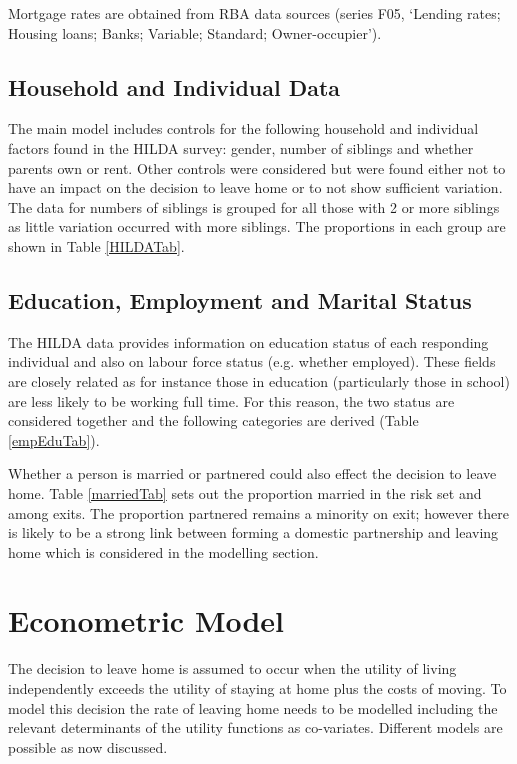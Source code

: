 \documentclass[12pt]{article}
\begin{document}
Mortgage rates are obtained from RBA data sources (series F05, `Lending rates; Housing loans; Banks; Variable; Standard; Owner-occupier').

\subsection{Household and Individual Data}

The main model includes controls for the following household and individual factors found in the HILDA survey: gender, number of siblings and whether parents own or rent.  Other controls were considered but were found either not to have an impact on the decision to leave home or to not show sufficient variation. The data for numbers of siblings is grouped for all those with 2 or more siblings as little variation occurred with more siblings. The proportions in each group are shown in Table \ref{HILDATab}.



\subsection{Education, Employment and Marital Status}

The HILDA data provides information on education status of each responding individual and also on labour force status (e.g. whether employed). These fields are closely related as for instance those in education (particularly those in school) are less likely to be working full time. For this reason, the two status are considered together and the following categories are derived (Table \ref{empEduTab}).



Whether a person is married or partnered could also effect the decision to leave home. Table \ref{marriedTab} sets out the proportion married in the risk set and among exits. The proportion partnered remains a minority on exit; however there is likely to be a strong link between forming a domestic partnership and leaving home which is considered in the modelling section.



\section{Econometric Model}

The decision to leave home is assumed to occur when the utility of living independently exceeds the utility of staying at home plus the costs of moving. To model this decision the rate of leaving home needs to be modelled including the relevant determinants of the utility functions as co-variates. Different models are possible as now discussed.
\end{document}
